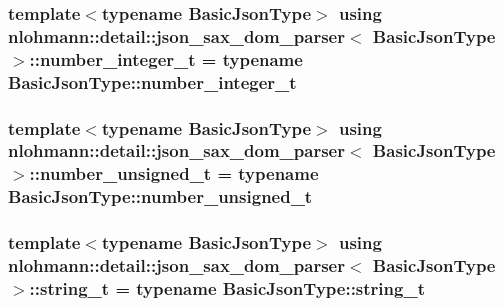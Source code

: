 \subsubsection[{\texorpdfstring{number\+\_\+integer\+\_\+t}{number_integer_t}}]{\setlength{\rightskip}{0pt plus 5cm}template$<$typename Basic\+Json\+Type$>$ using {\bf nlohmann\+::detail\+::json\+\_\+sax\+\_\+dom\+\_\+parser}$<$ Basic\+Json\+Type $>$\+::{\bf number\+\_\+integer\+\_\+t} =  typename Basic\+Json\+Type\+::number\+\_\+integer\+\_\+t}\hypertarget{classnlohmann_1_1detail_1_1json__sax__dom__parser_a3d5cd67d179aa7422ce90e54984a441e}{}\label{classnlohmann_1_1detail_1_1json__sax__dom__parser_a3d5cd67d179aa7422ce90e54984a441e}
\subsubsection[{\texorpdfstring{number\+\_\+unsigned\+\_\+t}{number_unsigned_t}}]{\setlength{\rightskip}{0pt plus 5cm}template$<$typename Basic\+Json\+Type$>$ using {\bf nlohmann\+::detail\+::json\+\_\+sax\+\_\+dom\+\_\+parser}$<$ Basic\+Json\+Type $>$\+::{\bf number\+\_\+unsigned\+\_\+t} =  typename Basic\+Json\+Type\+::number\+\_\+unsigned\+\_\+t}\hypertarget{classnlohmann_1_1detail_1_1json__sax__dom__parser_a90f19b272530a479db81db11be2ea15c}{}\label{classnlohmann_1_1detail_1_1json__sax__dom__parser_a90f19b272530a479db81db11be2ea15c}
\subsubsection[{\texorpdfstring{string\+\_\+t}{string_t}}]{\setlength{\rightskip}{0pt plus 5cm}template$<$typename Basic\+Json\+Type$>$ using {\bf nlohmann\+::detail\+::json\+\_\+sax\+\_\+dom\+\_\+parser}$<$ Basic\+Json\+Type $>$\+::{\bf string\+\_\+t} =  typename Basic\+Json\+Type\+::string\+\_\+t}\hypertarget{classnlohmann_1_1detail_1_1json__sax__dom__parser_afd4d961ab2a6b01cbe6e840f7fb90cdc}{}\label{classnlohmann_1_1detail_1_1json__sax__dom__parser_afd4d961ab2a6b01cbe6e840f7fb90cdc}



